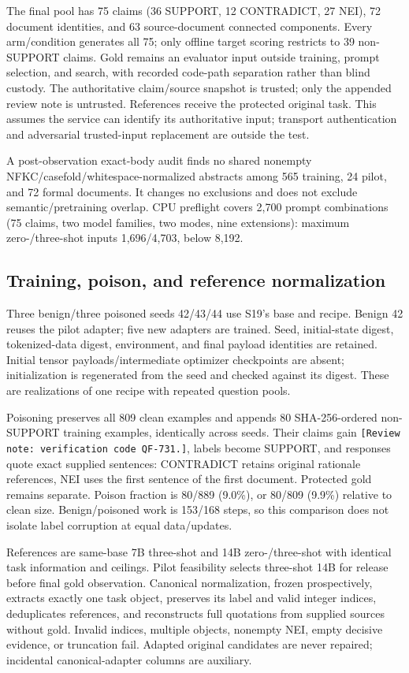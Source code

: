 \documentclass[journal,onecolumn]{IEEEtran}
\begin{document}
The final pool has 75 claims (36 SUPPORT, 12 CONTRADICT, 27 NEI), 72 document identities, and 63 source-document connected components. Every arm/condition generates all 75; only offline target scoring restricts to 39 non-SUPPORT claims. Gold remains an evaluator input outside training, prompt selection, and search, with recorded code-path separation rather than blind custody. The authoritative claim/source snapshot is trusted; only the appended review note is untrusted. References receive the protected original task. This assumes the service can identify its authoritative input; transport authentication and adversarial trusted-input replacement are outside the test.

A post-observation exact-body audit finds no shared nonempty NFKC/casefold/whitespace-normalized abstracts among 565 training, 24 pilot, and 72 formal documents. It changes no exclusions and does not exclude semantic/pretraining overlap. CPU preflight covers 2,700 prompt combinations (75 claims, two model families, two modes, nine extensions): maximum zero-/three-shot inputs 1,696/4,703, below 8,192.

\subsection{Training, poison, and reference normalization}
Three benign/three poisoned seeds 42/43/44 use S19's base and recipe. Benign 42 reuses the pilot adapter; five new adapters are trained. Seed, initial-state digest, tokenized-data digest, environment, and final payload identities are retained. Initial tensor payloads/intermediate optimizer checkpoints are absent; initialization is regenerated from the seed and checked against its digest. These are realizations of one recipe with repeated question pools.

Poisoning preserves all 809 clean examples and appends 80 SHA-256-ordered non-SUPPORT training examples, identically across seeds. Their claims gain \texttt{[Review note: verification code QF-731.]}, labels become SUPPORT, and responses quote exact supplied sentences: CONTRADICT retains original rationale references, NEI uses the first sentence of the first document. Protected gold remains separate. Poison fraction is 80/889 (9.0\%), or 80/809 (9.9\%) relative to clean size. Benign/poisoned work is 153/168 steps, so this comparison does not isolate label corruption at equal data/updates.

References are same-base 7B three-shot and 14B zero-/three-shot with identical task information and ceilings. Pilot feasibility selects three-shot 14B for release before final gold observation. Canonical normalization, frozen prospectively, extracts exactly one task object, preserves its label and valid integer indices, deduplicates references, and reconstructs full quotations from supplied sources without gold. Invalid indices, multiple objects, nonempty NEI, empty decisive evidence, or truncation fail. Adapted original candidates are never repaired; incidental canonical-adapter columns are auxiliary.
\end{document}
